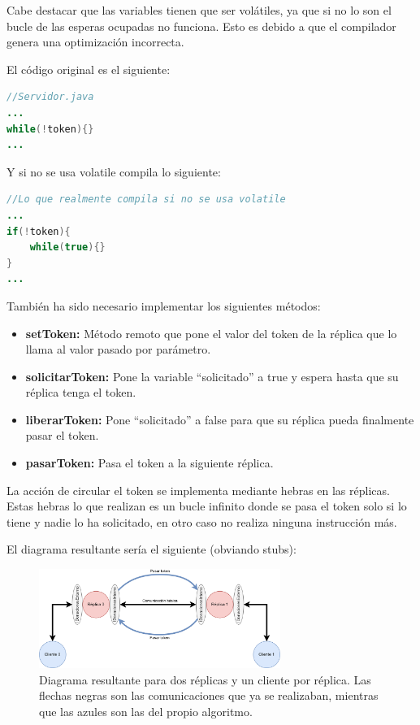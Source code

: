 \documentclass{article}
\begin{document}
Cabe destacar que las variables tienen que ser volátiles, ya que si no lo son el bucle de las esperas ocupadas no funciona. Esto es debido a que el compilador genera una optimización incorrecta.

\newpage

El código original es el siguiente:

\begin{lstlisting}[language=Java]
//Servidor.java
...
while(!token){}
...
\end{lstlisting}

Y si no se usa volatile compila lo siguiente:

\begin{lstlisting}[language=Java]
//Lo que realmente compila si no se usa volatile
...
if(!token){
    while(true){}
}
...
\end{lstlisting} 

\bigskip

También ha sido necesario implementar los siguientes métodos:

\begin{itemize}
    \item \textbf{setToken: }Método remoto que pone el valor del token de la réplica que lo llama al valor pasado por parámetro.
    \item \textbf{solicitarToken: }Pone la variable ``solicitado'' a true y espera hasta que su réplica tenga el token.
    \item \textbf{liberarToken: }Pone ``solicitado'' a false para que su réplica pueda finalmente pasar el token.
    \item \textbf{pasarToken: }Pasa el token a la siguiente réplica.
\end{itemize}

La acción de circular el token se implementa mediante hebras en las réplicas. Estas hebras lo que realizan es un bucle infinito donde se pasa el token solo si lo tiene y nadie lo ha solicitado, en otro caso no realiza ninguna instrucción más.

\bigskip

El diagrama resultante sería el siguiente (obviando stubs):

\begin{figure}[H]
    \centering
    \includegraphics[width=0.7\textwidth]{imagenes/diagramaAnillo.png}
    \caption{Diagrama resultante para dos réplicas y un cliente por réplica. Las flechas negras son las comunicaciones que ya se realizaban, mientras que las azules son las del propio algoritmo.}
\end{figure}
\end{document}
